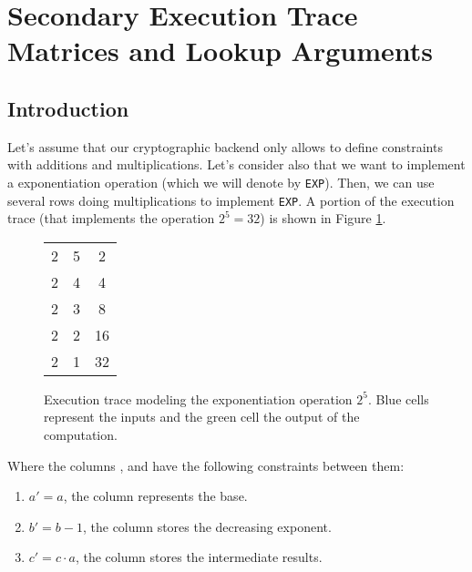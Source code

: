 



\section{Secondary Execution Trace Matrices and Lookup Arguments}

\subsection{Introduction}

Let’s assume that our cryptographic backend only allows to define constraints with additions and multiplications. Let’s consider also that we want to implement a exponentiation operation (which we will denote by \texttt{EXP}). Then, we can use several rows doing multiplications to implement \texttt{EXP}. A portion of the execution trace (that implements the operation $2^5 = 32$) is shown in Figure \ref{fig:exp-example}.

\begin{figure}[H]
\centering
\begin{tabular}{|c|c|c|}
\hline
\A & \B & \C \\ \hline
\cellcolor{cyan} 2 & \cellcolor{cyan} 5 & 2  \\ \hline
2 & 4 & 4  \\ \hline
2 & 3 & 8  \\ \hline
2 & 2 & 16 \\ \hline
2 & 1 & \cellcolor{green} 32 \\ \hline
\end{tabular}
\caption{Execution trace modeling the exponentiation operation $2^5$. Blue cells represent the inputs and the green cell the output of the  computation. }
\label{fig:exp-example}
\end{figure}

Where the columns \A, \B and \C have the following constraints between them:
\begin{enumerate}
\small
\item $a'=a$, the \A column represents the base.
\item $b'=b-1$, the \B column stores the decreasing exponent.
\item $c'=c\cdot a$, the \C column stores the intermediate results.
\end{enumerate}


